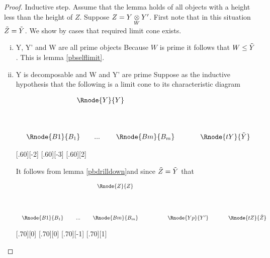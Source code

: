 \documentclass[10pt,a4paper]{scrartcl}
\begin{document}
\begin{proof}
Inductive step. Assume  that the lemma holds of all objects with a height less than the height of $Z$. Suppose $Z=\crossx{Y}{Y'}{W}$. First note that in this situation 
$\pbase{Z}=\pbase{Y}$. We show by cases that required limit cone exists.
\begin{enumerate}[(i)]
\item{Y, Y' and W are all prime objects}
Because $W$ is prime it follows that $W \leq  \pbase{Y}$. 
This is lemma \ref{pbselflimit}.


\item {Y is decomposable and W and Y' are prime}
Suppose as the inductive hypothesis that the following is a limit cone to its characteristic diagram 
\begin{center}
\begin{displaymath}
\begin{array}{c p{0.4cm} c  }
\Rnode{Y}{Y} &&   \\ [1.4cm]
\begin{array}{cp{0cm}c   p{0.1cm}     c  }					
                             \Rnode{B1}{B_1}&   & ... & & \Rnode{Bm}{B_m}
	                      \end{array} 
	 && \Rnode{tY}{\pbase{Y}}                                              
\end{array} 
\end{displaymath}

[.60][-2]
[.60][-3]
[.60][2]
\end{center}


It follows from  lemma \ref{pbdrilldown}and since $\pbase{Z}=\pbase{Y}$  that

\begin{center}
\begin{displaymath}
\begin{array}{c p{0.4cm} c  }
\Rnode{Z}{Z} &&   \\ [1.6cm]
\begin{array}{c  p{0.1cm}c   p{0.1cm}c  p{1.2cm}c }					
                             \Rnode{B1}{B_1}&& ... & & \Rnode{Bm}{B_m} && \Rnode{Yp}{Y'}
	                      \end{array} 
	 && \Rnode{tZ}{\pbase{Z}}                                              
\end{array} 
\end{displaymath}

[.70][0]
[.70][0]
[.70][-1]
[.70][1]
\end{center}


\end{enumerate}
\end{proof}
\end{document}
